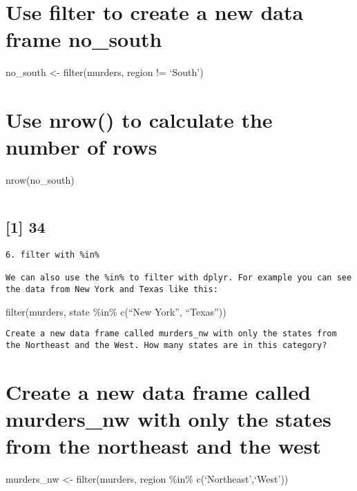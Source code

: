 \documentclass[
]{article}
\begin{document}
\hypertarget{use-filter-to-create-a-new-data-frame-no_south}{%
\section{Use filter to create a new data frame
no\_south}\label{use-filter-to-create-a-new-data-frame-no_south}}

no\_south \textless- filter(murders, region != `South')

\hypertarget{use-nrow-to-calculate-the-number-of-rows}{%
\section{Use nrow() to calculate the number of
rows}\label{use-nrow-to-calculate-the-number-of-rows}}

nrow(no\_south)

\begin{verbatim}
\end{verbatim}

\hypertarget{section-1}{%
\subsection{{[}1{]} 34}\label{section-1}}

\begin{verbatim}
6. filter with %in%
    
We can also use the %in% to filter with dplyr. For example you can see the data from New York and Texas like this:
\end{verbatim}

filter(murders, state \%in\% c(``New York'', ``Texas''))

\begin{verbatim}
Create a new data frame called murders_nw with only the states from the Northeast and the West. How many states are in this category?
\end{verbatim}

\hypertarget{create-a-new-data-frame-called-murders_nw-with-only-the-states-from-the-northeast-and-the-west}{%
\section{Create a new data frame called murders\_nw with only the states
from the northeast and the
west}\label{create-a-new-data-frame-called-murders_nw-with-only-the-states-from-the-northeast-and-the-west}}

murders\_nw \textless- filter(murders, region \%in\%
c(`Northeast',`West'))
\end{document}
